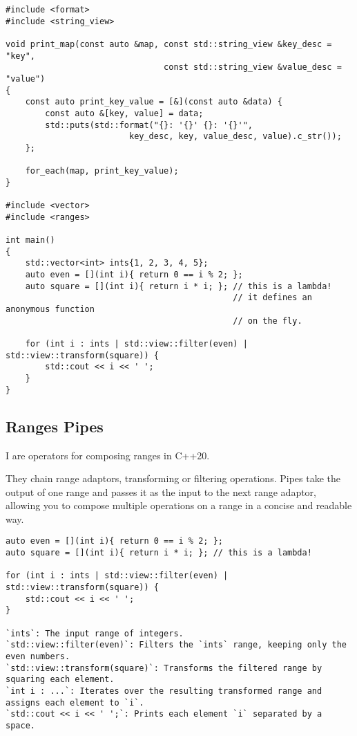 \begin{verbatim}
#include <format>
#include <string_view>

void print_map(const auto &map, const std::string_view &key_desc = "key",
                                const std::string_view &value_desc = "value")
{
    const auto print_key_value = [&](const auto &data) { 
        const auto &[key, value] = data;
        std::puts(std::format("{}: '{}' {}: '{}'",
                         key_desc, key, value_desc, value).c_str());
    };

    for_each(map, print_key_value);
}

#include <vector>
#include <ranges>

int main()
{
    std::vector<int> ints{1, 2, 3, 4, 5};
    auto even = [](int i){ return 0 == i % 2; };
    auto square = [](int i){ return i * i; }; // this is a lambda!
                                              // it defines an anonymous function
                                              // on the fly.

    for (int i : ints | std::view::filter(even) | std::view::transform(square)) {
        std::cout << i << ' ';
    }
}
\end{verbatim}

\subsection{Ranges Pipes}

I are operators for composing ranges in C++20.

They chain range adaptors, transforming or filtering operations.
Pipes take the output of one range and passes it as the input to the next range adaptor,
allowing you to compose multiple operations on a range in a concise and readable way.

\begin{verbatim}
auto even = [](int i){ return 0 == i % 2; };
auto square = [](int i){ return i * i; }; // this is a lambda!

for (int i : ints | std::view::filter(even) | std::view::transform(square)) {
    std::cout << i << ' ';
}

`ints`: The input range of integers.
`std::view::filter(even)`: Filters the `ints` range, keeping only the even numbers.
`std::view::transform(square)`: Transforms the filtered range by squaring each element.
`int i : ...`: Iterates over the resulting transformed range and assigns each element to `i`.
`std::cout << i << ' ';`: Prints each element `i` separated by a space.
\end{verbatim}

